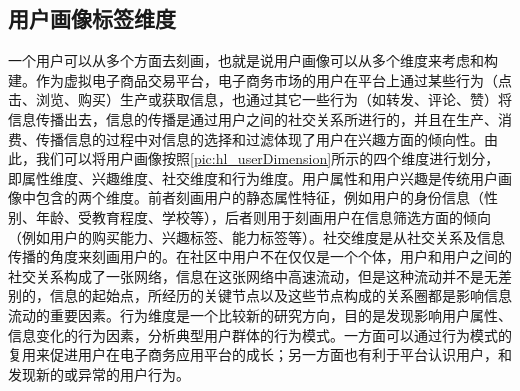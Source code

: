 		\subsection{用户画像标签维度}
	    一个用户可以从多个方面去刻画，也就是说用户画像可以从多个维度来考虑和构建。作为虚拟电子商品交易平台，电子商务市场的用户在平台上通过某些行为（点击、浏览、购买）生产或获取信息，也通过其它一些行为（如转发、评论、赞）将信息传播出去，信息的传播是通过用户之间的社交关系所进行的，并且在生产、消费、传播信息的过程中对信息的选择和过滤体现了用户在兴趣方面的倾向性。由此，我们可以将用户画像按照\autoref{pic:hl_userDimension}所示的四个维度进行划分，即属性维度、兴趣维度、社交维度和行为维度。用户属性和用户兴趣是传统用户画像中包含的两个维度。前者刻画用户的静态属性特征，例如用户的身份信息（性别、年龄、受教育程度、学校等），后者则用于刻画用户在信息筛选方面的倾向（例如用户的购买能力、兴趣标签、能力标签等）。社交维度是从社交关系及信息传播的角度来刻画用户的。在社区中用户不在仅仅是一个个体，用户和用户之间的社交关系构成了一张网络，信息在这张网络中高速流动，但是这种流动并不是无差别的，信息的起始点，所经历的关键节点以及这些节点构成的关系圈都是影响信息流动的重要因素。行为维度是一个比较新的研究方向，目的是发现影响用户属性、信息变化的行为因素，分析典型用户群体的行为模式。一方面可以通过行为模式的复用来促进用户在电子商务应用平台的成长；另一方面也有利于平台认识用户，和发现新的或异常的用户行为。    
	    \begin{figure}
	    \centering
	      \label{pic:hl_userDimension}
	    \end{figure}
        
